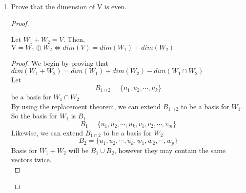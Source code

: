 \documentclass[11pt]{scrartcl}
\begin{document}
\begin{enumerate}[label=\alph*.]
{\begin{proof}
\begin{enumerate}[label=\roman*.]
{\begin{enumerate}[label=\arabic*.]
{				                  Let $x \in N_T + N_P$ such that $x = n_t + n_p$ where $n_t \in N_T \subseteq \mathrm{V}$ and $n_p \in N_P \subseteq \mathrm{V}$
				                  by Theorem 2.11. Since $\mathrm{V}$ is a vector space $n_t + n_p \in V$ by closure under addition.\\
				                  Thus, $ x \in \mathrm{V}$ and it follows that $N_T + N_P \subseteq \mathrm{V}$.
				                  }
				            \item{
				                  $\mathrm{V} \subseteq N_T + N_P $\\
				                  Let $x \in V$. We know that $x = P \circ T(x) + T \circ P(x)$.\\
				                  Notice that $P \circ T(x) \in N_P$ because $P \circ (P \circ T(x)) = 0$.\\
				                  Similarly, $T \circ P(x) \in N_T$ because $T \circ (T \circ P(x)) = 0$.\\
				                  Thus, $N_T + N_P \subseteq \mathrm{V}$.
				                  }
			            \end{enumerate}
			            Therefore, $N_T + N_P = \mathrm{V}$.
			            }
		      \end{enumerate}
		      Therefore, by definition $\mathrm{V} = N_T \oplus N_P$.
	      \end{proof}
	      }
	\item{
	      Prove that the dimension of $\mathrm{V}$ is even.
	      \begin{proof}\
		      \begin{lemma}
			      Let $W_1 + W_2 = V$. Then, $\mathrm{V} = W_1 \oplus W_2 \Leftrightarrow dim(V) = dim(W_1) + dim(W_2)$
			      \begin{proof}
				      We begin by proving that $dim(W_1 + W_2) = dim(W_1) + dim(W_2) - dim(W_1 \cap W_2)$\\
				      Let
				      \[B_{1\cap 2} = \{u_1, u_2, \cdots, u_k\}\]
				      be a basis for $W_1 \cap W_2$\\
				      By using the replacement theorem, we can extend $B_{1\cap 2}$ to be a basis for $W_1$.\\
				      So the basis for $W_1$ is $B_1$
				      \[B_1 = \{u_1, u_2, \cdots, u_k, v_1, v_2, \cdots, v_m\}\]
				      Likewise, we can extend $B_{1\cap 2}$ to be a basis for $W_2$
				      \[B_2 = \{u_1, u_2, \cdots, u_k, w_1, w_2, \cdots, w_p\}\]
				      Basis for $W_1 + W_2$ will be $B_1 \cup B_2$, however they may contain the same vectors twice.\\

\end{proof}
\end{lemma}
\end{proof}}
\end{enumerate}
\end{document}
